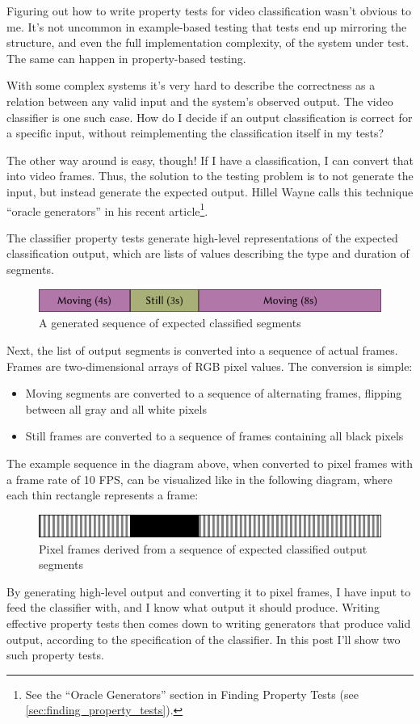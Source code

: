 Figuring out how to write property tests for video classification wasn't obvious to me. It's not uncommon in example-based testing that tests end up mirroring the structure, and even the full implementation complexity, of the system under test. The same can happen in property-based testing.

With some complex systems it's very hard to describe the correctness as a relation between any valid input and the system's observed output. The video classifier is one such case. How do I decide if an output classification is correct for a specific input, without reimplementing the classification itself in my tests?

The other way around is easy, though! If I have a classification, I can convert that into video frames. Thus, the solution to the testing problem is to not generate the input, but instead generate the expected output. Hillel Wayne calls this technique ``oracle generators'' in his recent article\footnote{See the ``Oracle Generators'' section in Finding Property Tests (see \ref{sec:finding_property_tests}).}.

The classifier property tests generate high-level representations of the expected classification output, which are lists of values describing the type and duration of segments.
\begin{figure}[htbp]
 \centering
 \includegraphics[width=.95\linewidth]{./pics/case2_1.png}
 \caption{A generated sequence of expected classified segments}
 \label{fig:case2_1}
\end{figure}
Next, the list of output segments is converted into a sequence of actual frames. Frames are two-dimensional arrays of RGB pixel values. The conversion is simple:

\begin{itemize}
\item Moving segments are converted to a sequence of alternating frames, flipping between all gray and all white pixels
\item Still frames are converted to a sequence of frames containing all black pixels
\end{itemize}
The example sequence in the diagram above, when converted to pixel frames with a frame rate of 10 FPS, can be visualized like in the following diagram, where each thin rectangle represents a frame:
\begin{figure}[htbp]
 \centering
 \includegraphics[width=.95\linewidth]{./pics/case2_2.png}
 \caption{Pixel frames derived from a sequence of expected classified output segments}
 \label{fig:case2_2}
\end{figure}
By generating high-level output and converting it to pixel frames, I have input to feed the classifier with, and I know what output it should produce. Writing effective property tests then comes down to writing generators that produce valid output, according to the specification of the classifier. In this post I'll show two such property tests.

